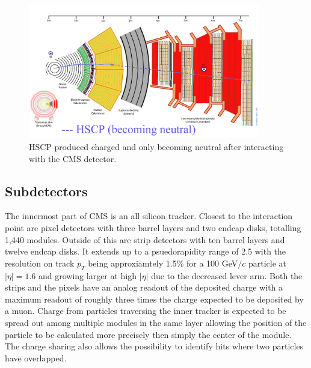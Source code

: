\begin{figure}
  \begin{center}
      \includegraphics[clip=true, trim=0.0cm 0cm 3.0cm 0cm, width=0.9\textwidth]{figures/apparatus/ParticleInCMS_0000_HSCP-(becoming-neutral).png}
      \caption[HSCP produced charged and becoming neutral after interacting with the CMS detector.]
        {HSCP produced charged and only becoming neutral after interacting with the CMS detector.
         }
      \label{fig:CMSTkOnly}
  \end{center}
\end{figure}

\subsection{Subdetectors \label{sec:subsystems}}
The innermost part of CMS is an all silicon tracker. Closest to the interaction point are pixel detectors with three barrel layers and two endcap disks, totalling 1,440 modules. 
Outside of this are strip detectors with ten barrel layers and twelve endcap disks. It extends up to a psuedorapidity range of 2.5 with the resolution on track
$p_T$ being approxiamtely 1.5\% for a 100 GeV$/c$ particle at $|\eta| = 1.6$ and growing larger at high $|\eta|$ due to the decreased lever arm. Both the strips and the
pixels have an analog readout of the deposited charge with a maximum readout of roughly three times the charge expected to be deposited by a muon. Charge from
particles traversing the inner tracker is expected to be spread out among multiple modules in the same layer allowing the position of the particle to be calculated
more precisely then simply the center of the module. The charge sharing also allows the possibility to identify hits where two particles have overlapped.


